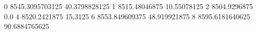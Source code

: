 0 8545.3095703125 40.3798828125
1 8515.48046875 10.55078125
2 8504.9296875 0.0
4 8520.2421875 15.3125
6 8553.849609375 48.919921875
8 8595.6181640625 90.6884765625
